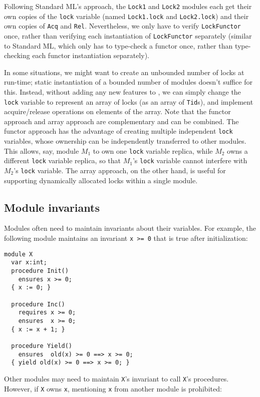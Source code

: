 Following Standard ML's approach, the \verb`Lock1` and \verb`Lock2` modules each get their own copies of the \verb`lock` variable (named \verb`Lock1.lock` and \verb`Lock2.lock`) and their own copies of \verb`Acq` and \verb`Rel`.
Nevertheless, we only have to verify \verb`LockFunctor` once, rather than verifying each instantiation of \verb`LockFunctor` separately
(similar to Standard ML, which only has to type-check a functor once, rather than type-checking each functor instantiation separately).

In some situations, we might want to create an unbounded number of locks at run-time;
static instantiation of a bounded number of modules doesn't suffice for this.
Instead, without adding any new features to \civl, we can simply change the \verb`lock` variable to represent an array of locks (as an array of \verb`Tid`s),
and implement acquire/release operations on elements of the array.
Note that the functor approach and array approach are complementary and can be combined.
The functor approach has the advantage of creating multiple independent \verb`lock` variables,
whose ownership can be independently transferred to other modules.
This allows, say, module $M_1$ to own one \verb`lock` variable replica,
while $M_2$ owns a different \verb`lock` variable replica,
so that $M_1$'s \verb`lock` variable cannot interfere with $M_2$'s \verb`lock` variable.
The array approach, on the other hand,
is useful for supporting dynamically allocated locks within a single module.

\subsection{Module invariants}

Modules often need to maintain invariants about their variables.
For example, the following module maintains an invariant \verb`x >= 0`
that is true after initialization:

\begin{verbatim}
module X
  var x:int;
  procedure Init()
    ensures x >= 0;
  { x := 0; }

  procedure Inc()
    requires x >= 0;
    ensures  x >= 0;
  { x := x + 1; }

  procedure Yield()
    ensures  old(x) >= 0 ==> x >= 0;
  { yield old(x) >= 0 ==> x >= 0; }
\end{verbatim}

\noindent
Other modules may need to maintain \verb`X`'s invariant to call \verb`X`'s procedures.
However, if \verb`X` owns \verb`x`, mentioning \verb`x` from another module is prohibited:

